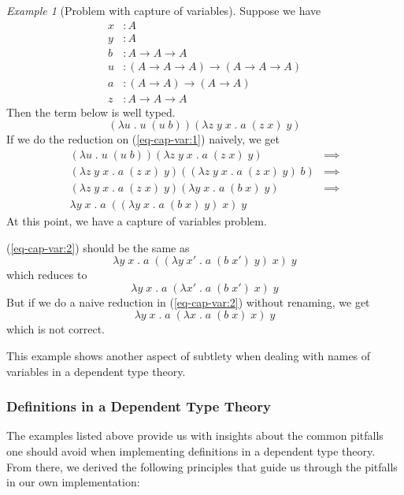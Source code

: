 \documentclass{article}
\theoremstyle{remark}
\newtheorem{example}{Example}[section]
\begin{document}
\begin{example}[Problem with capture of variables] \label{exa3}
  Suppose we have
  \begin{align*}
    x &: A \\
    y &: A \\
    b &: A \to A \to A \\
    u &: (A \to A \to A) \to (A \to A \to A) \\
    a &: (A \to A) \to (A \to A) \\
    z &: A \to A \to A
  \end{align*}
  Then the term below is well typed.
  \begin{equation} \label{eq-cap-var:1}
    (\lambda u \; . \; u \; (u \; b)) (\lambda z \; y \; x \; . \; a \; (z \; x) \; y)
  \end{equation}
  If we do the reduction on (\ref{eq-cap-var:1}) naively, we get
  \begin{align}
    (\lambda u \; . \; u \; (u \; b)) (\lambda z \; y \; x \; . \; a \; (z \; x) \; y) & \implies \nonumber \\
    (\lambda z \; y \; x \; . \; a \; (z \; x) \; y) ((\lambda z \; y \; x \; . \; a \; (z \; x) \; y) \; b) & \implies \nonumber \\
    (\lambda z \; y \; x \; . \; a \; (z \; x) \; y) (\lambda y \; x \; . \; a \; (b \; x) \; y) & \implies \nonumber \\
    \lambda y \; x \; . \; a \; ((\lambda y \; x \; . \; a \; (b \; x) \; y)\; x) \; y \label{eq-cap-var:2}
  \end{align}
  At this point, we have a capture of variables problem.

  (\ref{eq-cap-var:2}) should be the same as
  \[ \lambda y \; x \; . \; a \; ((\lambda y \; x' \; . \; a \; (b \; x') \; y)\; x) \; y \]
  which reduces to
  \[ \lambda y \; x \; . \; a \; (\lambda x' \; . \; a \; (b \; x') \; x) \; y \]
  But if we do a naive reduction in (\ref{eq-cap-var:2}) without renaming, we get 
  \[ \lambda y \; x \; . \; a \; (\lambda x \; . \; a \; (b \; x) \; x) \; y \]
  which is not correct.

  This example shows another aspect of subtlety when dealing with names of variables in a dependent type theory.
\end{example}

\subsubsection{Definitions in a Dependent Type Theory}
The examples listed above provide us with insights about the common pitfalls one should avoid when implementing definitions in a dependent type theory. From there, we derived the following principles that guide us through the pitfalls in our own implementation:
\end{document}

